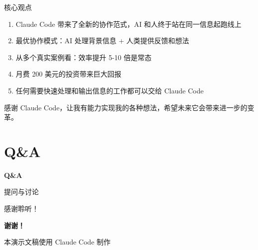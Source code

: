 \documentclass[aspectratio=169,xcolor=dvipsnames]{beamer}
\begin{document}
\begin{frame}{核心观点}
  \begin{enumerate}
    \item Claude Code 带来了全新的协作范式，AI 和人终于站在同一信息起跑线上

    \vspace{0.3cm}

    \item 最优协作模式：AI 处理背景信息 + 人类提供反馈和想法

    \vspace{0.3cm}

    \item 从多个真实案例看：效率提升 5-10 倍是常态

    \vspace{0.3cm}

    \item 月费 200 美元的投资带来巨大回报

    \vspace{0.3cm}

    \item 任何需要快速处理和输出信息的工作都可以交给 Claude Code
  \end{enumerate}

  \vspace{0.3cm}

  \begin{center}
    \Large
    感谢 Claude Code，让我有能力实现我的各种想法，希望未来它会带来进一步的变革。
  \end{center}
\end{frame}

\section{Q\&A}

\begin{frame}[plain]
  \centering
  \Huge \textbf{Q\&A}

  \vspace{1cm}
  \Large
  提问与讨论

  \vspace{1cm}
  \normalsize
  感谢聆听！
\end{frame}

\begin{frame}[plain]
  \centering
  \Huge \textbf{谢谢！}

  \vspace{1cm}
  \normalsize

  \vspace{0.5cm}
  \small
  本演示文稿使用 Claude Code 制作
\end{frame}
\end{document}
